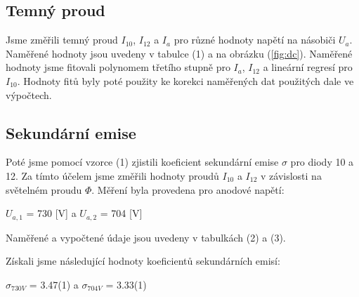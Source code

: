 \documentclass[a4paper,11pt]{article}
\begin{document}
\begin{minipage}[t]{0.5\textwidth}
            \subsection{Temný proud}
                Jsme změřili temný proud $I_{10}$, $I_{12}$ a $I_a$ pro různé hodnoty napětí na násobiči $U_a$. Naměřené hodnoty jsou uvedeny v tabulce (1) a na obrázku (\ref{fig:dc}). Naměřené hodnoty jsme fitovali polynomem třetího stupně pro $I_a$, $I_{12}$ a lineární regresí pro $I_{10}$. Hodnoty fitů byly poté použity ke korekci naměřených dat použitých dale ve výpočtech.  

            \subsection{Sekundární emise}
                \par Poté jsme pomocí vzorce (1) zjistili koeficient sekundární emise $\sigma$ pro diody 10 a 12. Za tímto účelem jsme změřili hodnoty proudů $I_10$ a $I_12$ v závislosti na světelném proudu $\Phi$. Měření byla provedena pro anodové napětí:
                \begin{center}
                    $U_{a,1}$ = 730 [V] a $U_{a,2}$ = 704 [V]
                \end{center}
                \par Naměřené a vypočtené údaje jsou uvedeny v tabulkách (2) a (3).

                \par Získali jsme následující hodnoty koeficientů sekundárních emisí: 
                \begin{center}
                    $\sigma_{730 V}$ = 3.47(1) a $\sigma_{704 V}$ = 3.33(1)
                \end{center}
    
    \end{minipage}
    \hspace{10pt}
\end{document}
